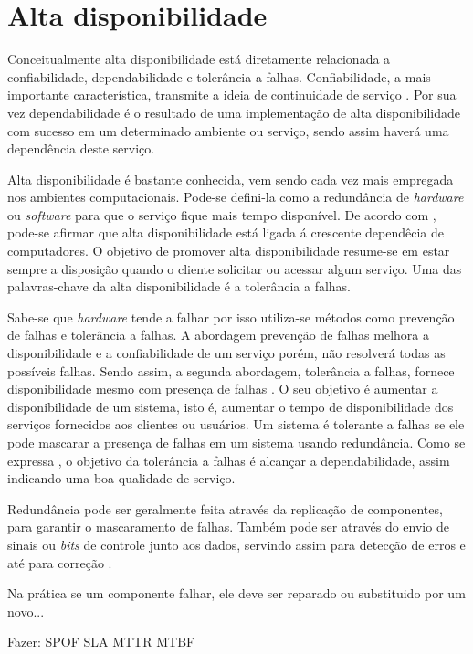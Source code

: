 \chapter{Alta disponibilidade}
Conceitualmente alta disponibilidade está diretamente relacionada a confiabilidade, dependabilidade e tolerância a falhas. 
Confiabilidade, a mais importante característica, transmite a ideia de continuidade de serviço \cite{pankaj1994}.
Por sua vez dependabilidade é o resultado de uma implementação de alta disponibilidade com sucesso em um determinado ambiente ou serviço,
sendo assim haverá uma dependência deste serviço.

Alta disponibilidade é bastante conhecida, vem sendo cada vez mais empregada nos ambientes computacionais.
Pode-se defini-la como a redundância de \textit{hardware} ou \textit{software} para que o serviço fique mais tempo disponível.
De acordo com \cite{costa2009}, pode-se afirmar que alta disponibilidade está ligada á crescente dependêcia de computadores.
O objetivo de promover alta disponibilidade resume-se em estar sempre a disposição quando o cliente solicitar ou acessar algum serviço.
Uma das palavras-chave da alta disponibilidade é a tolerância a falhas.

Sabe-se que \textit{hardware} tende a falhar por isso utiliza-se métodos como prevenção de falhas e tolerância a falhas.
A abordagem prevenção de falhas melhora a disponibilidade e a confiabilidade de um serviço porém, não resolverá todas as possíveis falhas.
Sendo assim, a segunda abordagem, tolerância a falhas, fornece disponibilidade mesmo com presença de falhas \cite{pankaj1994}.
O seu objetivo é aumentar a disponibilidade de um sistema, isto é, aumentar o tempo de disponibilidade dos serviços fornecidos aos clientes ou usuários. 
Um sistema é tolerante a falhas se ele pode mascarar a presença de falhas em um sistema usando redundância. Como se expressa \cite{costa2009}, 
o objetivo da tolerância a falhas é alcançar a dependabilidade, assim indicando uma boa qualidade de serviço.

Redundância pode ser geralmente feita através da replicação de componentes, para garantir o mascaramento de falhas. 
Também pode ser através do envio de sinais ou \textit{bits} de controle junto aos dados, servindo assim para detecção de erros e até para correção \cite{weber2002}.

Na prática se um componente falhar, ele deve ser reparado ou substituido por um novo...

Fazer: 
SPOF
SLA
MTTR
MTBF
